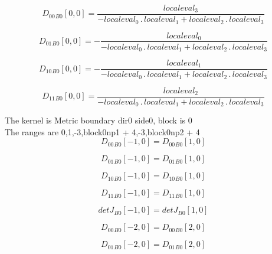 \documentclass{article}
\begin{document}
\begin{dmath}{D_{00}{_{B0}}}[{0,0}] = \frac{localeval_{3}}{- localeval_{0} \,.\, localeval_{1} + localeval_{2} \,.\, localeval_{3}}\end{dmath}

\begin{dmath}{D_{01}{_{B0}}}[{0,0}] = - \frac{localeval_{0}}{- localeval_{0} \,.\, localeval_{1} + localeval_{2} \,.\, localeval_{3}}\end{dmath}

\begin{dmath}{D_{10}{_{B0}}}[{0,0}] = - \frac{localeval_{1}}{- localeval_{0} \,.\, localeval_{1} + localeval_{2} \,.\, localeval_{3}}\end{dmath}

\begin{dmath}{D_{11}{_{B0}}}[{0,0}] = \frac{localeval_{2}}{- localeval_{0} \,.\, localeval_{1} + localeval_{2} \,.\, localeval_{3}}\end{dmath}

\noindent The kernel is Metric boundary dir0 side0, block is 0\\\noindent The ranges are 0,1,-3,block0np1 + 4,-3,block0np2 + 4\\\begin{dmath}{D_{00}{_{B0}}}[{-1,0}] = {D_{00}{_{B0}}}[{1,0}]\end{dmath}

\begin{dmath}{D_{01}{_{B0}}}[{-1,0}] = {D_{01}{_{B0}}}[{1,0}]\end{dmath}

\begin{dmath}{D_{10}{_{B0}}}[{-1,0}] = {D_{10}{_{B0}}}[{1,0}]\end{dmath}

\begin{dmath}{D_{11}{_{B0}}}[{-1,0}] = {D_{11}{_{B0}}}[{1,0}]\end{dmath}

\begin{dmath}{detJ{_{B0}}}[{-1,0}] = {detJ{_{B0}}}[{1,0}]\end{dmath}

\begin{dmath}{D_{00}{_{B0}}}[{-2,0}] = {D_{00}{_{B0}}}[{2,0}]\end{dmath}

\begin{dmath}{D_{01}{_{B0}}}[{-2,0}] = {D_{01}{_{B0}}}[{2,0}]\end{dmath}
\end{document}
